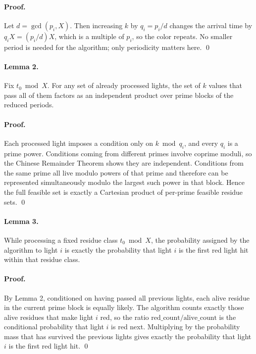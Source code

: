 \documentclass[11pt]{article}
\begin{document}
\paragraph{Proof.}
Let $d=\gcd(p_i, X)$. Then increasing $k$ by $q_i = p_i/d$ changes the arrival time by
$q_i X = (p_i/d)X$, which is a multiple of $p_i$, so the color repeats.
No smaller period is needed for the algorithm; only periodicity matters here. \qed

\paragraph{Lemma 2.}
Fix $t_0 \bmod X$.
For any set of already processed lights, the set of $k$ values that pass all of them factors as an
independent product over prime blocks of the reduced periods.

\paragraph{Proof.}
Each processed light imposes a condition only on $k \bmod q_i$, and every $q_i$ is a prime power.
Conditions coming from different primes involve coprime moduli, so the Chinese Remainder Theorem
shows they are independent.
Conditions from the same prime all live modulo powers of that prime and therefore can be represented
simultaneously modulo the largest such power in that block. Hence the full feasible set is exactly a
Cartesian product of per-prime feasible residue sets. \qed

\paragraph{Lemma 3.}
While processing a fixed residue class $t_0 \bmod X$, the probability assigned by the algorithm to light
$i$ is exactly the probability that light $i$ is the first red light hit within that residue class.

\paragraph{Proof.}
By Lemma 2, conditioned on having passed all previous lights, each alive residue in the current prime
block is equally likely.
The algorithm counts exactly those alive residues that make light $i$ red, so the ratio
$\text{red\_count}/\text{alive\_count}$ is the conditional probability that light $i$ is red next.
Multiplying by the probability mass that has survived the previous lights gives exactly the probability
that light $i$ is the first red light hit. \qed
\end{document}

